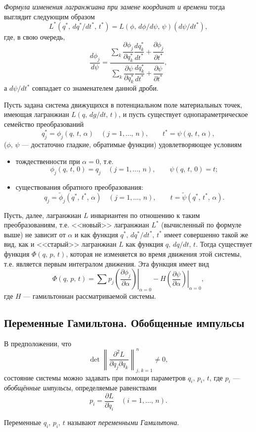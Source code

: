 \documentclass[a4paper]{article}
\begin{document}
\emph{Формула изменения лагранжиана при замене координат и времени} тогда
выглядит следующим образом
\[
	L^*(q^*,\,dq^* /dt^*,\,t^*)=L(\phi,\,d\phi /d\psi,\,\psi)(d\psi /dt^*)
,\]
где, в свою очередь,
\[
\frac{d\phi_j}{d\psi}=\dfrac{\displaystyle\sum\limits_{k}
	\dfrac{\partial \phi_j}{\partial q_k^*} 
\dfrac{dq^*_k}{dt^*}+\dfrac{\partial \phi_j}{\partial t^*} }{\displaystyle\sum\limits_{k}
\dfrac{\partial \psi}{\partial q_k^*} 
\dfrac{dq^*_k}{dt^*}+\dfrac{\partial \psi}{\partial t^*} }
,\]
а $d \psi /dt^*$ совпадает со знаменателем данной дроби.
\begin{thm}[Нётер]
	Пусть задана система движущихся в потенциальном поле материальных
	точек, имеющая лагранжиан $L(q,\, dg /dt,\, t)$, и пусть существует
	однопараметрическое семейство преобразований
	\[
		q_j^*=\phi_j(q,\,t,\,\alpha) \quad (j=1,\ldots,\, n),
		\qquad t^*=\psi(q,\,t,\,\alpha),
	\]
	($\phi,\,\psi$ --- достаточно гладкие, обратимые функции)
	удовлетворяющее условиям
	\begin{itemize}
		\item тождественности при $\alpha=0$, т.\:е.
			\[
				\phi_j(q,\,t,\,0)=q_j \quad(j=1,\ldots,\,n),
				\qquad \psi(q,\,t,\,0)=t;
			\]
		\item существования обратного преобразования:
			\[
				q_j= \tilde{\phi}_j(q^*,\,t^*,\,\alpha) \quad
				(j=1,\ldots,\,n), \qquad
				t=\tilde{\psi}(q^*,\,t^*,\,\alpha)
			.\] 
	\end{itemize}
	Пусть, далее, лагранжиан $L$ инвариантен по отношению к таким
	преобразованиям,  т.\:е. <<новый>> лагранжиан  $L^*$ (вычисленный по
	формуле выше) не зависит от $\alpha$ и как функция $q^*,\,dq^* /dt^*,\,
	t^*$ имеет совершенно такой же вид, как и <<старый>> лагранжиан
	$L$ как функция $q,\,dq /dt,\,t$. Тогда существует функция $\Phi(q,\,p,\,t)$,
	которая не изменяется во время движения этой системы, т.\:е.
	является первым интегралом движения. Эта функция имеет вид
	\[
		\Phi(q,\,p,\,t)= \sum p_j \left.\left(\frac{\partial \phi_j}{\partial \alpha}
			\right)\right|_{\alpha=0}-H\left.\left( \frac{\partial
			\psi}{\partial \alpha}  \right) \right|_{\alpha=0}
	,\] 
	где $H$ --- гамильтониан рассматриваемой системы.
\end{thm}
\subsection{Переменные Гамильтона. Обобщенные импульсы}
В предположении, что
\[
	\det \left\|\frac{\partial ^2 L}{\partial \dot{q}_j \partial \dot{q}_k} \right\|^n
	_{j,\,k=1}\neq 0
,\] 
состояние системы можно задавать при помощи параметров $q_i,\,p_i,\,t$, где
 $p_i$ --- \emph{обобщённые импульсы}, определяемые равенствами
 \[
	 p_i=\frac{\partial L}{\partial \dot{q}_i} \quad (i=1,\ldots,\,n)
 .\] 
\begin{dfn}
	Переменные $q_i,\,p_i,\,t$ называют \emph{переменными Гамильтона}.
\end{dfn}
\end{document}
